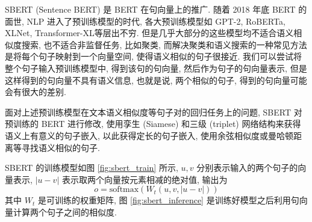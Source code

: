 \documentclass[12pt]{article}
\begin{document}
SBERT (Sentence BERT) \cite{Reimers2019Sentence} 是 BERT 在句向量上的推广. 随着 2018 年底 BERT 的面世, NLP 进入了预训练模型的时代, 各大预训练模型如 GPT-2, RoBERTa, XLNet, Transformer-XL等层出不穷. 但是几乎大部分的这些模型均不适合语义相似度搜索, 也不适合非监督任务, 比如聚类, 而解决聚类和语义搜索的一种常见方法是将每个句子映射到一个向量空间, 使得语义相似的句子很接近. 我们可以尝试将整个句子输入预训练模型中, 得到该句的句向量, 然后作为句子的句向量表示, 但是这样得到的句向量不具有语义信息, 也就是说, 两个相似的句子, 得到的句向量可能会有很大的差别.

面对上述预训练模型在文本语义相似度等句子对的回归任务上的问题, SBERT 对预训练的 BERT 进行修改, 使用孪生 (Siamese) 和三级 (triplet) 网络结构来获得语义上有意义的句子嵌入, 以此获得定长的句子嵌入, 使用余弦相似度或曼哈顿距离等寻找语义相似的句子.

SBERT 的训练模型如图 \ref{fig:sbert_train} 所示, $u, v$ 分别表示输入的两个句子的向量表示, $|u-v|$ 表示取两个向量按元素相减的绝对值, 输出为
\begin{equation}
  o=\mathrm{softmax}(W_t(u,v,|u-v|))
\end{equation}
其中 $W_t$ 是可训练的权重矩阵, 图 \ref{fig:sbert_inference} 是训练好模型之后利用句向量计算两个句子之间的相似度.
\end{document}
